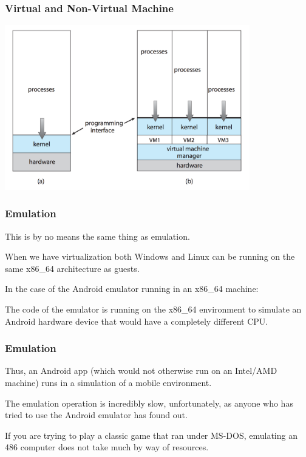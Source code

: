 \begin{frame}
\frametitle{Virtual and Non-Virtual Machine}

\begin{center}
	\includegraphics[width=0.8\textwidth]{images/non-virtual-machine.png}
\end{center}

\end{frame}

\begin{frame}
\frametitle{Emulation}

This is by no means the same thing as \alert{emulation}. 

When we have virtualization both Windows and Linux can be running on the same x86\_64 architecture as guests. 

In the case of the Android emulator running in an x86\_64 machine: 

The code of the emulator is running on the x86\_64 environment to simulate an Android hardware device that would have a completely different CPU. 

\end{frame}

\begin{frame}
\frametitle{Emulation}

Thus, an Android app (which would not otherwise run on an Intel/AMD machine) runs in a simulation of a mobile environment. 

The emulation operation is incredibly slow, unfortunately, as anyone who has tried to use the Android emulator has found out. 

If you are trying to play a classic game that ran under MS-DOS, emulating an 486 computer does not take much by way of resources.



\end{frame}

